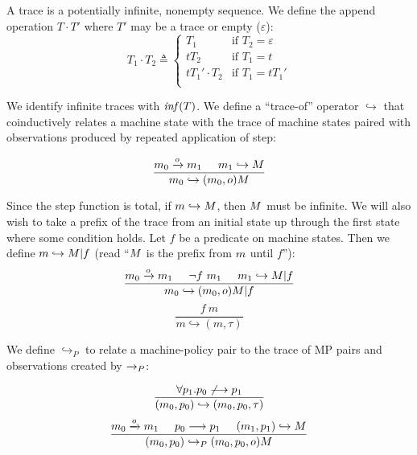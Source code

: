 \documentclass[conference]{IEEEtran}
\begin{document}
    A trace is a potentially infinite, nonempty sequence. We define the append operation \(T \cdot T'\)
    where \(T'\) may be a trace or empty (\(\varepsilon\)):
    \[T_1 \cdot T_2 \triangleq
      \begin{cases}
        T_1 & \text{if } T_2 = \varepsilon \\
        t T_2 & \text{if } T_1 = t \\
        t T_1' \cdot T_2 & \text{if } T_1 = t T_1' \\
      \end{cases}\]

    We identify infinite traces with \(\mathit{inf}(T)\). We define a ``trace-of'' operator \(\hookrightarrow\)
    that coinductively relates a machine state with the trace of machine states paired with observations
    produced by repeated application of step:

    \[\frac{m_0 \xrightarrow{o} m_1 \hspace{.5cm} m_1 \hookrightarrow M}
           {m_0 \hookrightarrow (m_0,o) M}\]

    Since the step function is total, if \(m \hookrightarrow M\), then \(M\) must be infinite.
    We will also wish to take a prefix of the trace from an initial state up through 
    the first state where some condition holds. Let \(f\) be a predicate on machine states.
    Then we define \(m \hookrightarrow M | f\) (read ``\(M\) is the prefix from
    \(m\) until \(f\)''):
    \[\frac{m_0 \xrightarrow{o} m_1 \hspace{.5cm} \neg f\ m_1 \hspace{.5cm} m_1
              \hookrightarrow M | f}
           {m_0 \hookrightarrow (m_0,o) M | f}\]
    \[\frac{f\ m}
           {m \hookrightarrow (m,\tau)}\]

    We define \(\hookrightarrow_P\) to relate a machine-policy pair to the trace of MP pairs and observations
    created by \(\xrightarrow{}_P\):

    \[\frac{\forall p_1 . p_0 \not \longrightarrow p_1}
           {(m_0,p_0) \hookrightarrow (m_0,p_0,\tau)}\]
    \[\frac{m_0 \xrightarrow{o} m_1 \hspace{.5cm} p_0 \longrightarrow p_1 \hspace{.5cm}
              (m_1,p_1) \hookrightarrow M}
           {(m_0,p_0) \hookrightarrow_P (m_0,p_0,o) M}\]
    
\end{document}
